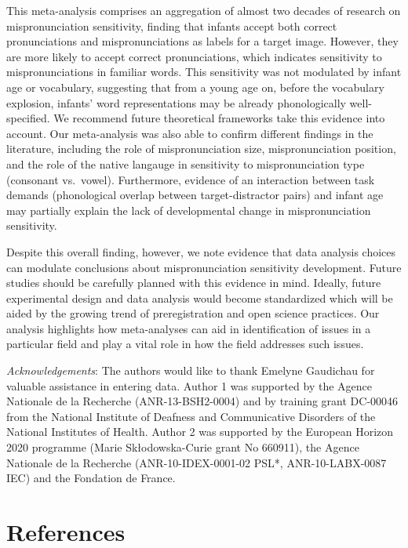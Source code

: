 \documentclass[man]{apa6}
\begin{document}
This meta-analysis comprises an aggregation of almost two decades of research on mispronunciation sensitivity, finding that infants accept both correct pronunciations and mispronunciations as labels for a target image. However, they are more likely to accept correct pronunciations, which indicates sensitivity to mispronunciations in familiar words. This sensitivity was not modulated by infant age or vocabulary, suggesting that from a young age on, before the vocabulary explosion, infants' word representations may be already phonologically well-specified. We recommend future theoretical frameworks take this evidence into account. Our meta-analysis was also able to confirm different findings in the literature, including the role of mispronunciation size, mispronunciation position, and the role of the native langauge in sensitivity to mispronunciation type (consonant vs.~vowel). Furthermore, evidence of an interaction between task demands (phonological overlap between target-distractor pairs) and infant age may partially explain the lack of developmental change in mispronunciation sensitivity.

Despite this overall finding, however, we note evidence that data analysis choices can modulate conclusions about mispronunciation sensitivity development. Future studies should be carefully planned with this evidence in mind. Ideally, future experimental design and data analysis would become standardized which will be aided by the growing trend of preregistration and open science practices. Our analysis highlights how meta-analyses can aid in identification of issues in a particular field and play a vital role in how the field addresses such issues.

\newpage

\emph{Acknowledgements}: The authors would like to thank Emelyne Gaudichau for valuable assistance in entering data. Author 1 was supported by the Agence Nationale de la Recherche (ANR-13-BSH2-0004) and by training grant DC-00046 from the National Institute of Deafness and Communicative Disorders of the National Institutes of Health. Author 2 was supported by the European Horizon 2020 programme (Marie Skłodowska-Curie grant No 660911), the Agence Nationale de la Recherche (ANR-10-IDEX-0001-02 PSL*, ANR-10-LABX-0087 IEC) and the Fondation de France.

\newpage

\hypertarget{references}{%
\section{References}\label{references}}
\end{document}
